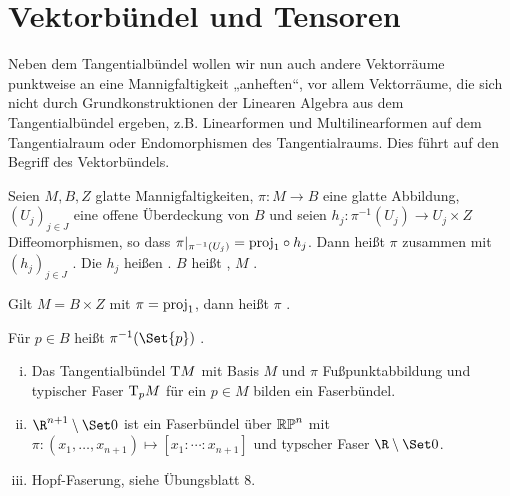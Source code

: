 \chapter{Vektorbündel und Tensoren}


Neben dem Tangentialbündel wollen wir nun auch andere Vektorräume punktweise an eine Mannigfaltigkeit „anheften“, vor allem Vektorräume, die sich nicht durch Grundkonstruktionen der Linearen Algebra aus dem Tangentialbündel ergeben, z.B. Linearformen und Multilinearformen auf dem Tangentialraum oder Endomorphismen des Tangentialraums.
Dies führt auf den Begriff des Vektorbündels.

\begin{df}[Faserbündel] \label{5.1}
    Seien $M, B, Z$ glatte Mannigfaltigkeiten, $\pi: M \to B$ eine glatte Abbildung, $(U_j)_{j\in J}$ eine offene Überdeckung von $B$ und seien
    \begin{math}
        h_j: \pi^{-1}(U_j) \to U_j \times Z
    \end{math}
    Diffeomorphismen, so dass $\pi|_{\pi^{-1}(U_j)} = \mathord{\operatorname{proj}}_1 \circ h_j$.
    Dann heißt $\pi$ zusammen mit $(h_j)_{j\in J}$ .
    Die $h_j$ heißen .
    $B$ heißt , $M$ .

    Gilt $M = B \times Z$ mit $\pi = \mathord{\operatorname{proj}}_1$, dann heißt $\pi$ .

    Für $p \in B$ heißt $\pi^{-1}(\Set{p})$ .
\end{df}

\begin{ex*}
    \begin{enumerate}[(i)]
        \item
            Das Tangentialbündel $\mathrm{T} M$ mit Basis $M$ und $\pi$ Fußpunktabbildung und typischer Faser $\mathrm{T}_p M$ für ein $p \in M$ bilden ein Faserbündel.
        \item
            $\R^{n+1} \setminus \Set 0$ ist ein Faserbündel über $\mathbb{RP}^n$ mit
            \begin{math}
                \pi: (x_1, \dotsc, x_{n+1}) \mapsto [x_1: \dotsb : x_{n+1}]
            \end{math}
            und typscher Faser $\R \setminus \Set 0$.
        \item
            Hopf-Faserung, siehe Übungsblatt 8.
    \end{enumerate}
\end{ex*}

